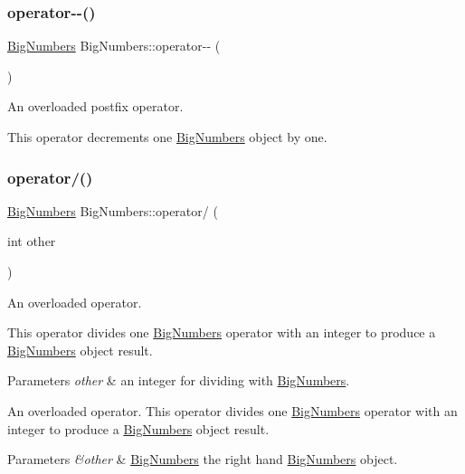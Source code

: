 \subsubsection{\texorpdfstring{operator-\/-\/()}{operator--()}}
{\footnotesize\ttfamily \mbox{\hyperlink{class_big_numbers}{Big\+Numbers}} Big\+Numbers\+::operator-\/-\/ (\begin{DoxyParamCaption}{ }\end{DoxyParamCaption})}



An overloaded postfix operator. 

This operator decrements one \mbox{\hyperlink{class_big_numbers}{Big\+Numbers}} object by one. \mbox{\label{class_big_numbers_a81092d96f7775984c5e6ab79c603b8c2}} 
\subsubsection{\texorpdfstring{operator/()}{operator/()}}
{\footnotesize\ttfamily \mbox{\hyperlink{class_big_numbers}{Big\+Numbers}} Big\+Numbers\+::operator/ (\begin{DoxyParamCaption}\item[{int}]{other }\end{DoxyParamCaption})}



An overloaded operator. 

This operator divides one \mbox{\hyperlink{class_big_numbers}{Big\+Numbers}} operator with an integer to produce a \mbox{\hyperlink{class_big_numbers}{Big\+Numbers}} object result. 
\begin{DoxyParams}{Parameters}
{\em other} & an integer for dividing with \mbox{\hyperlink{class_big_numbers}{Big\+Numbers}}.\\
\hline
\end{DoxyParams}
An overloaded operator. This operator divides one \mbox{\hyperlink{class_big_numbers}{Big\+Numbers}} operator with an integer to produce a \mbox{\hyperlink{class_big_numbers}{Big\+Numbers}} object result. 
\begin{DoxyParams}{Parameters}
{\em \&other} & \mbox{\hyperlink{class_big_numbers}{Big\+Numbers}} the right hand \mbox{\hyperlink{class_big_numbers}{Big\+Numbers}} object. \\
\hline
\end{DoxyParams}
\mbox{\label{class_big_numbers_acc7490767828ba1addc49d07a5be3757}} 
